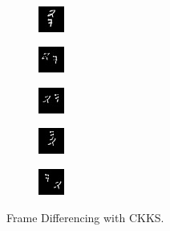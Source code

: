     \\ \bigskip
    \begin{subfigure}[t]{0.9\textwidth}
        \centering
        \begin{subfigure}[t]{0.19\textwidth}
            \centering
            \includegraphics[scale=2]{figures/CKKS-DIFFERENCING/frame0}
        \end{subfigure}
        \hfill
        \begin{subfigure}[t]{0.19\textwidth}
            \centering
            \includegraphics[scale=2]{figures/CKKS-DIFFERENCING/frame4}
        \end{subfigure}
        \hfill
        \begin{subfigure}[t]{0.19\textwidth}
            \centering
            \includegraphics[scale=2]{figures/CKKS-DIFFERENCING/frame8}
        \end{subfigure}
        \hfill
        \begin{subfigure}[t]{0.19\textwidth}
            \centering
            \includegraphics[scale=2]{figures/CKKS-DIFFERENCING/frame12}
        \end{subfigure}
        \hfill
        \begin{subfigure}[t]{0.19\textwidth}
            \centering
            \includegraphics[scale=2]{figures/CKKS-DIFFERENCING/frame16}
        \end{subfigure}
        \caption{Frame Differencing with CKKS.}
    \end{subfigure}
    \\ \bigskip
